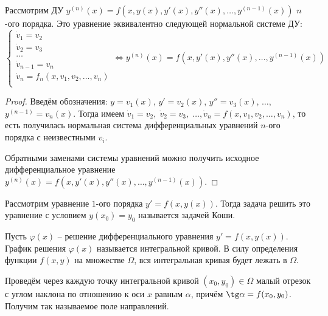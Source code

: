 \begin{proposition}
    Рассмотрим ДУ $y^{(n)}(x) = f(x, y(x), y'(x), y''(x), \dots, y^{(n-1)}(x))$ $n$-ого порядка. Это уравнение эквивалентно следующей нормальной системе ДУ:
    \begin{equation}
        \begin{cases}
            \dot v_1 = v_2 \\
            \dot v_2 = v_3 \\
            \dots \\
            \dot v_{n-1} = v_n \\
            \dot v_n = f_n(x, v_1, v_2, \dots, v_n) \\
        \end{cases}
        \Leftrightarrow y^{(n)}(x) = f(x, y'(x), y''(x), \dots, y^{(n-1)}(x))
    \end{equation}
\end{proposition}

\begin{proof}
    Введём обозначения: $y = v_1(x)$, $y' = v_2(x)$,
    $y'' = v_3(x)$, $\dots$, $y^{(n - 1)} = v_n(x)$. Тогда имеем $\dot v_1 = v_2, \; \dot v_2 = v_3, \; \dots, \dot v_n = f(x, v_1, v_2, \dots, v_n)$, то есть получилась нормальная система дифференциальных уравнений $n$-ого порядка с неизвестными $v_i$.

    Обратными заменами системы уравнений можно получить исходное дифференциальное уравнение $y^{(n)}(x) = f(x, y'(x), y''(x), \dots, y^{(n-1)}(x))$.
\end{proof}

\begin{definition}
    Рассмотрим уравнение $1$-ого порядка $y' = f(x, y(x))$. Тогда задача решить это уравнение с условием $y(x_0) = y_0$ называется задачей Коши.
\end{definition}

\begin{definition}
    Пусть $\varphi(x)$ -- решение дифференциального уравнения $y' = f(x, y(x))$. График решения $\varphi(x)$ называется интегральной кривой. В силу определения функции $f(x, y)$ на множестве $\Omega$, вся интегральная кривая будет лежать в $\Omega$.
\end{definition}

\begin{definition}
    Проведём через каждую точку интегральной кривой $(x_0, y_0) \in \Omega$ малый отрезок с углом наклона по отношению к оси $x$ равным $\alpha$, причём $\tg \alpha = f(x_0, y_0)$. Получим так называемое поле направлений. 
\end{definition}

